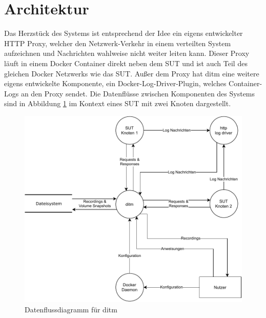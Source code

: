 \documentclass[12pt,a4paper]{report}
\begin{document}
\section{Architektur}
Das Herzstück des Systems ist entsprechend der Idee ein eigens entwickelter HTTP Proxy, welcher den Netzwerk-Verkehr in einem
verteilten System aufzeichnen und Nachrichten wahlweise nicht weiter leiten kann. Dieser Proxy läuft in einem Docker Container
direkt neben dem SUT und ist auch Teil des gleichen Docker Netzwerks wie das SUT. Außer dem Proxy hat ditm eine weitere eigens
entwickelte Komponente, ein Docker-Log-Driver-Plugin, welches Container-Logs an den Proxy sendet. Die Datenflüsse zwischen
Komponenten des Systems sind in Abbildung \ref{fig:dataflow} im Kontext eines SUT mit zwei Knoten dargestellt.
\begin{figure}[H]
	\centering
	\includegraphics[width=\linewidth]{img/ditm-Dataflow.pdf}
	\caption{Datenflussdiagramm für ditm}
	\label{fig:dataflow}
\end{figure}
\end{document}
